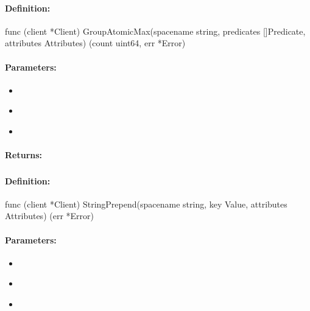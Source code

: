 \paragraph{Definition:}
\begin{gocode}
func (client *Client) GroupAtomicMax(spacename string, predicates []Predicate, attributes Attributes) (count uint64, err *Error)
\end{gocode}

\paragraph{Parameters:}
\begin{itemize}[noitemsep]
\item {}\\

\item {}\\

\item {}\\

\end{itemize}

\paragraph{Returns:}


\pagebreak
\subsubsection{}
\label{api:Go:StringPrepend}


\paragraph{Definition:}
\begin{gocode}
func (client *Client) StringPrepend(spacename string, key Value, attributes Attributes) (err *Error)
\end{gocode}

\paragraph{Parameters:}
\begin{itemize}[noitemsep]
\item {}\\

\item {}\\

\item {}\\

\end{itemize}

